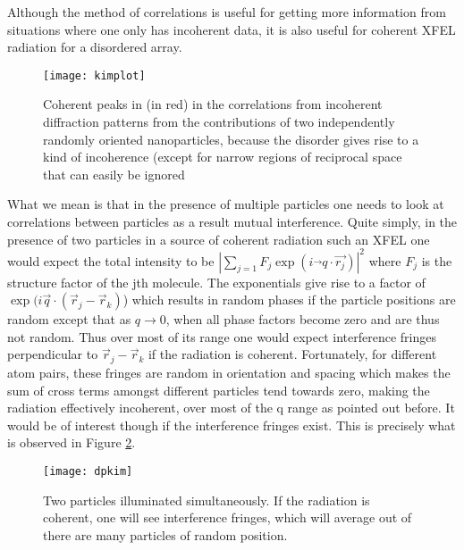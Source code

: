 Although the method of correlations is useful for getting more information from situations where one only has incoherent data, it is also useful for coherent XFEL radiation for a disordered array.
\begin{figure}[ht]
  \centering
  \texttt{[image: kimplot]}
\caption{Coherent peaks in (in red) in the correlations from incoherent diffraction patterns from the contributions of two independently randomly oriented nanoparticles, because the disorder gives rise to a kind of incoherence (except for narrow regions of reciprocal space that can easily be ignored \cite{kimmedicine}}
\label{fig:kimmedicine}
\end{figure}
What we mean is that in the presence of multiple particles one needs to look at correlations between particles as a result mutual interference. Quite simply, in the presence of two particles in a source of coherent radiation such an XFEL one would expect the total intensity to be $|\sum_{j=1} F_j \exp⁡(i\vec{}q\cdot\vec{r_j})|^2$ where $F_j$ is the structure factor of the jth molecule. The exponentials give rise to a factor of $\exp⁡(i\vec{q}\cdot(\vec{r}_j-\vec{r}_k )$) which results in random phases if the particle positions are random except that as $q\rightarrow 0$, when all phase factors become zero and are thus not random. Thus over most of its range one would expect interference fringes perpendicular to $\vec{r}_j-\vec{r}_k$  if the radiation is coherent. Fortunately, for different atom pairs, these fringes are random in orientation and spacing which makes the sum of cross terms amongst different particles tend towards zero, making the radiation effectively incoherent, over most of the q range as pointed out
before. It would be of interest though if the interference fringes exist. This is precisely what is observed in Figure \ref{fig:dpkim}. 
\begin{figure}[ht]
  \centering
  \texttt{[image: dpkim]}
\caption{Two particles illuminated simultaneously. If the radiation is coherent, one will see interference fringes, which will average out of there are many particles of random position.}
\label{fig:dpkim}
\end{figure}

